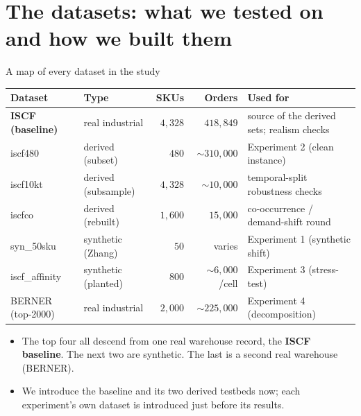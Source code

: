 \documentclass[11pt,aspectratio=169]{beamer}
\newcommand{\term}[1]{\textcolor{blue!60!black}{\textbf{#1}}}
\begin{document}
\section{The datasets: what we tested on and how we built them}

\begin{frame}{A map of every dataset in the study}
  \footnotesize
  \begin{table}\centering
  \begin{tabular}{@{}llrrl@{}}
  \toprule
  Dataset & Type & SKUs & Orders & Used for\\
  \midrule
  \textbf{ISCF (baseline)} & real industrial & $4{,}328$ & $418{,}849$ & source of the derived sets; realism checks\\
  iscf480 & derived (subset) & $480$ & $\sim\!310{,}000$ & Experiment 2 (clean instance)\\
  iscf10kt & derived (subsample) & $4{,}328$ & $\sim\!10{,}000$ & temporal-split robustness checks\\
  iscfco & derived (rebuilt) & $1{,}600$ & $15{,}000$ & co-occurrence / demand-shift round\\
  syn\_50sku & synthetic (Zhang) & $50$ & varies & Experiment 1 (synthetic shift)\\
  iscf\_affinity & synthetic (planted) & $800$ & $\sim\!6{,}000$/cell & Experiment 3 (stress-test)\\
  BERNER (top-2000) & real industrial & $2{,}000$ & $\sim\!225{,}000$ & Experiment 4 (decomposition)\\
  \bottomrule
  \end{tabular}
  \end{table}
  \begin{itemize}
    \item The top four all descend from one real warehouse record, the \term{ISCF baseline}. The next two are synthetic. The last is a second real warehouse (BERNER).
    \item We introduce the baseline and its two derived testbeds now; each experiment's own dataset is introduced just before its results.
  \end{itemize}
\end{frame}
\end{document}
